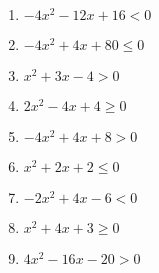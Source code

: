 \documentclass[11pt]{article}
\begin{document}
\begin{exercice}[1]
\begin{multicols}{3}
\begin{enumerate}[itemsep=1em]
\item  $-4x^2-12x+16< 0$ 
\item  $-4x^2+4x+80\leq 0$ 
\item  $x^2+3x-4>0$ 
\item  $2x^2-4x+4\geq 0$ 
\item  $-4x^2+4x+8>0$ 
\item  $x^2+2x+2\leq 0$ 
\item  $-2x^2+4x-6< 0$ 
\item  $x^2+4x+3\geq 0$ 
\item  $4x^2-16x-20>0$ 
\end{enumerate}
\end{multicols}
\end{exercice}
\end{document}
